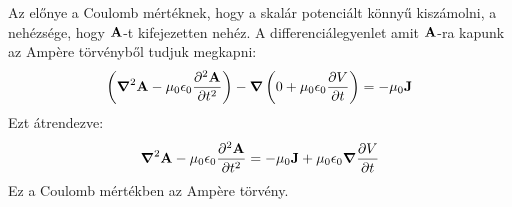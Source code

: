 \documentclass[a4paper,12pt]{article}
\begin{document}
Az előnye a Coulomb mértéknek, hogy a skalár potenciált könnyű kiszámolni, a nehézsége, hogy $\bold{A}$-t kifejezetten nehéz. A differenciálegyenlet amit $\bold{A}$-ra kapunk az Ampère törvényből tudjuk megkapni:
\begin{equation}
    \left(\boldsymbol{\nabla}^2 \bold{A} - \mu_0 \epsilon_0 \frac{\partial^2 \bold{A}}{\partial t^2}\right) - \boldsymbol{\nabla} \left(0 + \mu_0 \epsilon_0 \frac{\partial V}{\partial t}\right) = - \mu_0 \bold{J}
\end{equation}
Ezt átrendezve:
\begin{equation}
    \boldsymbol{\nabla}^2 \bold{A} - \mu_0 \epsilon_0 \frac{\partial^2 \bold{A}}{\partial t^2} = - \mu_0 \bold{J} + \mu_0 \epsilon_0 \boldsymbol{\nabla} \frac{\partial V}{\partial t}
\end{equation}
Ez a Coulomb mértékben az Ampère törvény.
\end{document}
